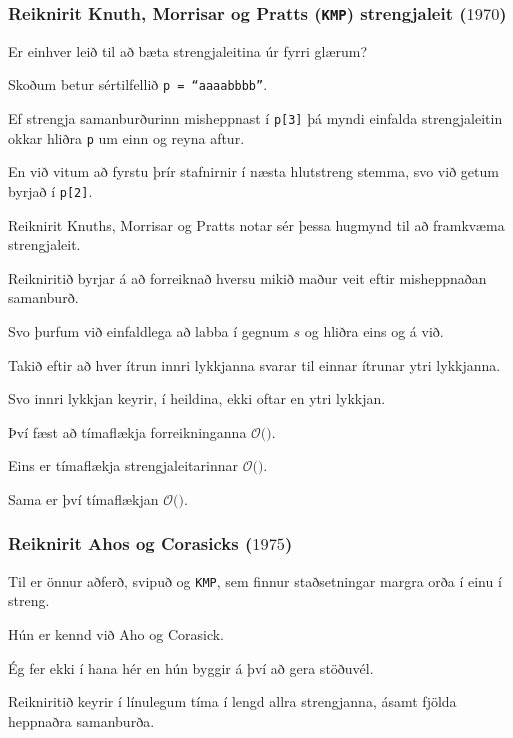 {
	\frametitle{Reiknirit Knuth, Morrisar og Pratts (\texttt{KMP}) strengjaleit ($1970$)}
	{
		\item<1-> Er einhver leið til að bæta strengjaleitina úr fyrri glærum?
		\item<2-> Skoðum betur sértilfellið \texttt{p = ``aaaabbbb''}.
		\item<3-> Ef strengja samanburðurinn misheppnast í \texttt{p[3]} þá myndi einfalda strengjaleitin okkar hliðra \texttt{p} um einn og reyna aftur.
		\item<4-> En við vitum að fyrstu þrír stafnirnir í næsta hlutstreng stemma, svo við getum byrjað í \texttt{p[2]}.
		\item<5-> Reiknirit Knuths, Morrisar og Pratts notar sér þessa hugmynd til að framkvæma strengjaleit.
		\item<6-> Reikniritið byrjar á að forreiknað hversu mikið maður veit eftir misheppnaðan samanburð.
	}
}

{
}

{
	{
		\item<1-> Svo þurfum við einfaldlega að labba í gegnum $s$ og hliðra eins og á við.
	}
}

{
}

{
	{
		\item<1-> Takið eftir að hver ítrun innri lykkjanna svarar til einnar ítrunar ytri lykkjanna.
		\item<2-> Svo innri lykkjan keyrir, í heildina, ekki oftar en ytri lykkjan.
		\item<3-> Því fæst að tímaflækja forreikninganna $\mathcal{O}($\onslide<4->{$\,m\,$}$)$.
		\item<5-> Eins er tímaflækja strengjaleitarinnar $\mathcal{O}($\onslide<6->{$\,n\,$}$)$.
		\item<7-> Sama er því tímaflækjan $\mathcal{O}($\onslide<8->{$n + m$}$)$.
	}
}

{
	\frametitle{Reiknirit Ahos og Corasicks ($1975$)}
	{
		\item<1-> Til er önnur aðferð, svipuð og \texttt{KMP}, sem finnur staðsetningar margra orða í einu í streng.
		\item<2-> Hún er kennd við Aho og Corasick.
		\item<3-> Ég fer ekki í hana hér en hún byggir á því að gera stöðuvél.
		\item<4-> Reikniritið keyrir í línulegum tíma í lengd allra strengjanna, ásamt fjölda heppnaðra samanburða.
	}
}

